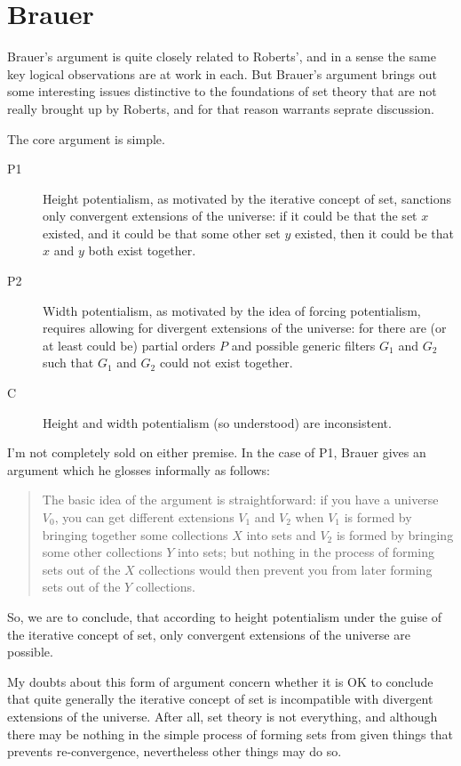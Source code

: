\documentclass{article}
\begin{document}
\section{Brauer}
Brauer's argument is quite closely related to Roberts', and in a sense the 
same key logical observations are at work in each. But Brauer's argument brings 
out some interesting issues distinctive to the foundations of set theory 
that are not really brought up by Roberts, and for that reason 
warrants seprate discussion.

The core argument is simple.
\begin{description}
    \item[P1] Height potentialism, as motivated by the iterative concept of set,
    sanctions only convergent extensions of the universe: if it could be that 
    the set $x$ existed, and it could be that some other set $y$ existed, 
    then it could be that $x$ and $y$ 
    both exist together.  
    \item[P2] Width potentialism, as motivated by the idea of forcing potentialism,
    requires allowing for divergent extensions of the universe: 
    for there are (or at least could be) partial orders 
    $P$ and possible generic filters $G_1$ and $G_2$ such that $G_1$ and $G_2$ 
    could not exist together.
    \item[C] Height and width potentialism (so understood) are inconsistent.
\end{description}
I'm not completely sold on either premise. In the case of P1,
Brauer gives an argument which he glosses informally as follows:
\begin{quote}
    The basic idea of the argument is straightforward: 
    if you have a universe $V_0$, you can get different extensions 
    $V_1$ and $V_2$ when $V_1$ 
    is formed by bringing together some collections $X$ into sets and 
    $V_2$ is formed by bringing some other collections $Y$ into sets; 
    but nothing in the process of forming sets out of the 
    $X$ collections would then prevent you from 
    later forming sets out of the $Y$ collections.
\end{quote}
So, we are to conclude, that according to height potentialism under the guise of
the iterative concept of set, only convergent extensions of the universe are possible.

My doubts about this form of argument concern whether it is OK to conclude 
that quite generally the iterative concept of set is incompatible with 
divergent extensions of the universe. After all, set theory is not everything, 
and although there may be nothing in the simple process of forming sets 
from given things that prevents 
re-convergence, nevertheless other things may do so. 
\end{document}
